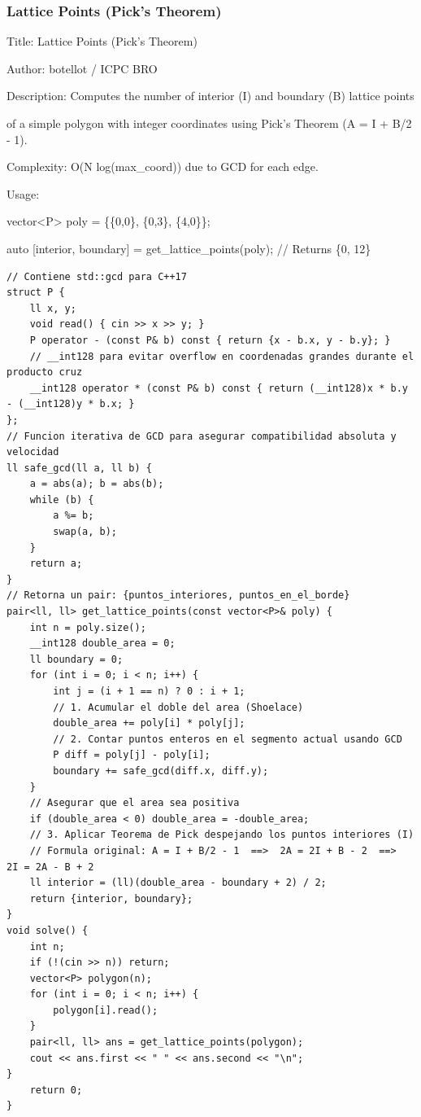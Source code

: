 \documentclass[10pt,landscape,twocolumn]{article}
\begin{document}
\subsubsection{Lattice Points (Pick's Theorem)}
\begin{flushleft}
\footnotesize\ttfamily
\par\noindent Title: Lattice Points (Pick's Theorem)
\par\noindent Author: botellot / ICPC BRO
\par\noindent Description: Computes the number of interior (I) and boundary (B) lattice points
\par\noindent of a simple polygon with integer coordinates using Pick's Theorem (A = I + B/2 - 1).
\par\noindent Complexity: O(N log(max\_coord)) due to GCD for each edge.
\par\noindent Usage:
\par\noindent vector\textless{}P\textgreater{} poly = \{\{0,0\}, \{0,3\}, \{4,0\}\};
\par\noindent auto [interior, boundary] = get\_lattice\_points(poly); // Returns \{0, 12\}
\end{flushleft}

\begin{lstlisting}
// Contiene std::gcd para C++17
struct P {
    ll x, y;
    void read() { cin >> x >> y; }
    P operator - (const P& b) const { return {x - b.x, y - b.y}; }
    // __int128 para evitar overflow en coordenadas grandes durante el producto cruz
    __int128 operator * (const P& b) const { return (__int128)x * b.y - (__int128)y * b.x; }
};
// Funcion iterativa de GCD para asegurar compatibilidad absoluta y velocidad
ll safe_gcd(ll a, ll b) {
    a = abs(a); b = abs(b);
    while (b) {
        a %= b;
        swap(a, b);
    }
    return a;
}
// Retorna un pair: {puntos_interiores, puntos_en_el_borde}
pair<ll, ll> get_lattice_points(const vector<P>& poly) {
    int n = poly.size();
    __int128 double_area = 0;
    ll boundary = 0;
    for (int i = 0; i < n; i++) {
        int j = (i + 1 == n) ? 0 : i + 1;
        // 1. Acumular el doble del area (Shoelace)
        double_area += poly[i] * poly[j];
        // 2. Contar puntos enteros en el segmento actual usando GCD
        P diff = poly[j] - poly[i];
        boundary += safe_gcd(diff.x, diff.y);
    }
    // Asegurar que el area sea positiva
    if (double_area < 0) double_area = -double_area;
    // 3. Aplicar Teorema de Pick despejando los puntos interiores (I)
    // Formula original: A = I + B/2 - 1  ==>  2A = 2I + B - 2  ==>  2I = 2A - B + 2
    ll interior = (ll)(double_area - boundary + 2) / 2;
    return {interior, boundary};
}
void solve() {
    int n; 
    if (!(cin >> n)) return;
    vector<P> polygon(n);
    for (int i = 0; i < n; i++) {
        polygon[i].read();
    }
    pair<ll, ll> ans = get_lattice_points(polygon);
    cout << ans.first << " " << ans.second << "\n";
}
    return 0;
}
\end{lstlisting}
\end{document}
